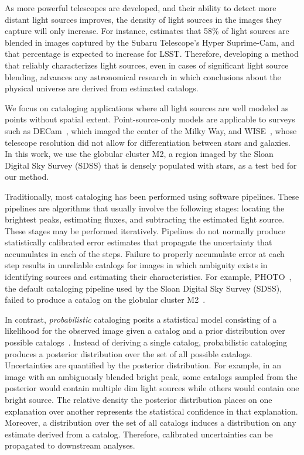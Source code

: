 As more powerful telescopes are developed, and their ability to detect more distant light sources improves, the density of light sources in the images they capture will only increase. 
For instance, \cite{bosch2018hyper} estimates that 58\% of light sources are blended in images captured by the Subaru Telescope’s Hyper Suprime-Cam, and that percentage is expected to increase for LSST. 
Therefore, developing a method that reliably characterizes light sources, even in cases of significant light source blending, 
advances any astronomical research in which conclusions about the physical universe are derived from estimated catalogs. 

We focus on cataloging applications where all light sources are well modeled as points without spatial extent. 
Point-source-only models are applicable to surveys such as DECam~\citep{Schlafly_2018_DECam}, which imaged the center of the  Milky Way, and WISE~\citep{Wright_2010_WISESurvey}, whose telescope resolution did not allow for differentiation between stars and galaxies.
In this work, we use the globular cluster M2, a region imaged by the Sloan Digital Sky Survey (SDSS) that is densely populated with stars, as a test bed for our method. 

\bigbreak


Traditionally, most cataloging has been performed using software pipelines.
These pipelines are algorithms that usually involve the following stages: locating the brightest peaks, estimating fluxes, and subtracting the estimated light source.
These stages may be performed iteratively.
Pipelines do not normally produce statistically calibrated error estimates that propagate 
the uncertainty that accumulates in each of the steps. 
Failure to properly accumulate error at each step results in unreliable catalogs for images in which ambiguity exists in identifying sources and estimating their characteristics.
For example, PHOTO~\citep{lupton2001sdss}, the default cataloging pipeline used by the Sloan Digital Sky Survey (SDSS), failed to 
produce a catalog on the globular cluster M2~\citep{Portillo_2017}. 

In contrast, {\itshape probabilistic} cataloging posits a statistical model consisting of a likelihood for the observed image given a catalog and a prior distribution over possible catalogs~\citep{Portillo_2017, Brewer_2013, Feder_2019}. 
Instead of deriving a single catalog, probabilistic cataloging produces a posterior distribution over the set of all possible catalogs. 
Uncertainties are quantified by the posterior distribution. 
For example, in an image with an ambiguously blended bright peak, some catalogs sampled from the posterior would contain multiple dim light sources while others would contain one bright source. 
The relative density the posterior distribution places on one explanation over another represents the statistical confidence in that explanation. 
Moreover, a distribution over the set of all catalogs induces a distribution on any estimate derived from a catalog. Therefore, calibrated uncertainties can be propagated to downstream analyses.  

